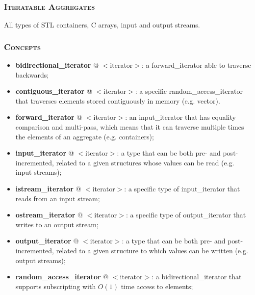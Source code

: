 \documentclass[10pt]{article}
\begin{document}
\begin{multicols*}{5}
{\subsubsection*{\textsc{Iteratable Aggregates}} 
\noindent
All types of STL containers, C arrays, input and output streams.

\subsubsection*{\textsc{Concepts}} 
\begin{itemize}[leftmargin=*,topsep=0.25pt]
  \setlength\itemsep{-1.8pt}
	\item \textbf{bidirectional\_iterator} @ $<$iterator$>$: a forward\_iterator able to traverse backwards; 
	\item \textbf{contiguous\_iterator} @ $<$iterator$>$: a specific ran\-dom\_ac\-cess\_i\-te\-ra\-tor that traverses elements stored contiguously in memory (e.g. vector). 
	\item \textbf{forward\_iterator} @ $<$iterator$>$: an input\_iterator that has equality comparison and multi-pass, which means that it can traverse multiple times the elements of an aggregate (e.g. containers); 
	\item \textbf{input\_iterator} @ $<$iterator$>$: a type that can be both pre- and post-incremented, related to a given structures whose values can be read (e.g. input streams);
	\item \textbf{istream\_iterator} @ $<$iterator$>$: a specific type of in\-put\_i\-te\-ra\-tor that reads from an input stream;
	\item \textbf{ostream\_iterator} @ $<$iterator$>$: a specific type of out\-put\_i\-te\-ra\-tor that writes to an output stream;
	\item \textbf{output\_iterator} @ $<$iterator$>$: a type that can be both pre- and post-incremented, related to a given structure to which values can be written (e.g. output streams);
	\item \textbf{random\_access\_iterator} @ $<$iterator$>$: a bidirectional\_iterator that supports subscripting with $O(1)$ time access to elements; 
\end{itemize}

}
\end{multicols*}
\end{document}
